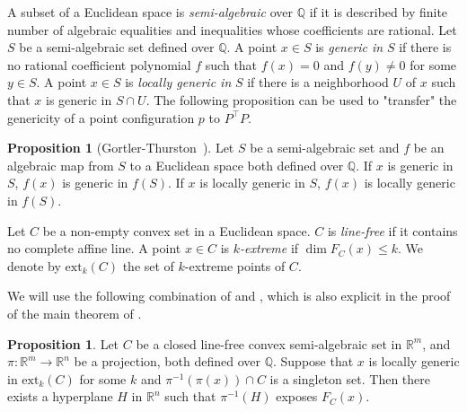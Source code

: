\documentclass[11pt]{article}
\theoremstyle{definition}
\newtheorem{prop}[defi]{Proposition}
\begin{document}
  A subset of a Euclidean space is {\em semi-algebraic} over $\mathbb{Q}$ if it is described by finite number of algebraic equalities and inequalities
        whose coefficients are rational.
        Let $S$ be a semi-algebraic set defined over $\mathbb{Q}$.
        A point $x \in S$ is {\em generic in} $S$ if there is no rational coefficient polynomial $f$
        such that $f(x)=0$ and $f(y) \neq 0$ for some $y \in S$.
        A point $x \in S$ is {\em locally generic in} $S$ if there is a neighborhood $U$ of $x$ such that $x$ is generic in $S \cap U$.
    The following proposition can be used to "transfer" the genericity of a point configuration  $p$ to  $P^{\top}P$. 
    \begin{prop} [{Gortler-Thurston~\cite[Lemma 2.6]{GT}}]\label{prop inherit genericity}
        Let $S$ be a semi-algebraic set and $f$ be an algebraic map from $S$ to a Euclidean space both defined over $\mathbb{Q}$.
        If $x$ is generic in $S$, $f(x)$ is generic in $f(S)$. 
        If $x$ is locally generic in $S$, $f(x)$ is locally generic in $f(S)$.
    \end{prop}


Let $C$ be a non-empty convex set in a Euclidean space. 
$C$ is {\em line-free} if it contains no complete affine line.
A point  $x \in C$ is {\em $k$-extreme} if $\dim F_C(x) \leq k$.
We denote by $\text{ext}_k(C)$ the set of $k$-extreme points of $C$.

We will use the following combination of \cite[Proposition 4.14]{GT} and \cite[Theorem 2]{GT}, which is also explicit in the proof of the main theorem of \cite{GT}.
 \begin{prop} \label{prop:GT}
        Let $C$ be a closed line-free convex semi-algebraic set in $\mathbb{R}^m$, and $\pi:\mathbb{R}^m\rightarrow \mathbb{R}^n$ be a projection, both defined over $\mathbb{Q}$.
       Suppose that $x$ is locally generic in $\text{ext}_k(C)$ for some $k$ and $\pi^{-1}(\pi(x))\cap C$ is a singleton set.
        Then there exists a hyperplane $H$ in $\mathbb{R}^n$ such that $\pi^{-1}(H)$ exposes $F_C(x)$.
    \end{prop}   
\end{document}
